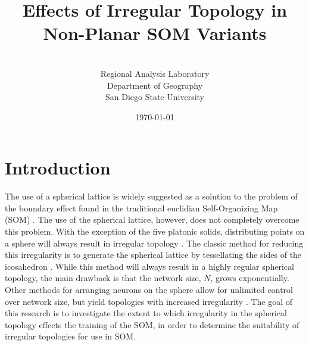 \documentclass[11pt]{article}
\title{Effects of Irregular Topology in Non-Planar SOM Variants}
\author{\sc{Charles R. Schmidt}\\Regional Analysis Laboratory\\Department of Geography\\San Diego State University}
\date{\today} %
\begin{document}
\maketitle



\section{Introduction}
The use of a spherical lattice is widely suggested as a solution to the problem
of the boundary effect found in the traditional euclidian Self-Organizing Map
(SOM) \citep{ritter99, boudjemai2003, sangole03, wu2006, Nishio:2006fk}.  The
use of the spherical lattice, however, does not completely overcome this
problem.  With the exception of the five platonic solids, distributing points on
a sphere will always result in irregular topology \citep{ritter99}.  The classic
method for reducing this irregularity is to generate the spherical lattice by
tessellating the sides of the icosahedron \citep{Niskio:2006fk}.  While this
method will always result in a highly regular spherical topology, the main
drawback is that the network size, \(N\), grows exponentially. Other methods for
arranging neurons on the sphere allow for unlimited control over network size,
but yield topologies with increased irregularity \citep{harris2000, wu2005,
Niskio:2006fh}.  The goal of this research is to investigate the extent to which
irregularity in the spherical topology effects the training of the SOM, in order
to determine the suitability of irregular topologies for use in SOM.
\end{document}
